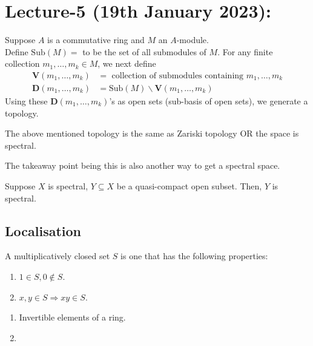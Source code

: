 \documentclass[oneside, 12pt, ]{scrbook}
\theoremstyle{theorem}
\begin{document}
\chapter{Lecture-5 (19th January 2023):}

Suppose $A$ is a commutative ring and $M$ an $A$-module. \\
Define $\mathrm{Sub}(M)=$ to be the set of all submodules of $M$. For any finite collection $m_{1}, \hdots , m_{k} \in M$, we next define 
\begin{align*}
\textbf{V}(m_{1}, \hdots , m_{k}) &= \text{ collection of submodules containing } m_{1}, \hdots , m_{k} \\
\textbf{D}( m_{1}, \hdots , m_{k}  ) &= \mathrm{Sub}(M) \backslash \textbf{V}(m_{1}, \hdots , m_{k}) 
\end{align*}
Using these $\textbf{D}(m_{1}, \hdots , m_{k})$'s as open sets (sub-basis of open sets), we generate a topology. 

\begin{proposition}
The above mentioned topology is the same as Zariski topology OR the space is spectral.
\end{proposition}

\begin{remark}
The takeaway point being this is also another way to get a spectral space.
\end{remark}

\begin{exercise}
Suppose $X$ is spectral, $Y\subseteq X$ be a quasi-compact open subset. Then, $Y$ is spectral.
\end{exercise}

\section{Localisation}

\begin{definition}
A multiplicatively closed set $S$ is one that has the following properties:
\begin{enumerate}
\item $1 \in S, 0 \not \in S$.
\item $x,y \in S \Rightarrow xy \in S$.
\end{enumerate}
\end{definition}

\begin{example}
\begin{enumerate}
\item Invertible elements of a ring.
\item 
\end{enumerate}
\end{example}
\end{document}
